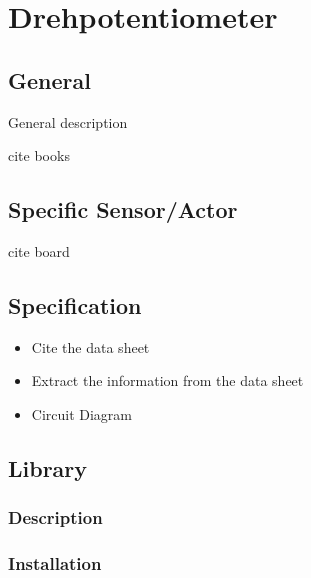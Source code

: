 %
%

\chapter{Drehpotentiometer}


%
%

\section{General}

General description

cite books

\section{Specific Sensor/Actor}

cite board

\section{Specification}

\begin{itemize}
  \item Cite the data sheet
  \item Extract the information from the data sheet
  \item Circuit Diagram
\end{itemize}

\section{Library}

\subsection{Description}

\subsection{Installation}

